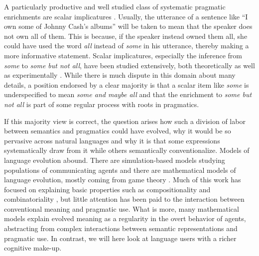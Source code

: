 \documentclass[a4paper, 11pt]{article}
\theoremstyle{Satz}
\begin{document}
A particularly productive and well studied class of systematic pragmatic enrichments are scalar
implicatures
\citep{horn:1984,Hirschberg1985:A-Theory-of-Sca,LevinsonPragmatics1983,Geurts2010:Quantity-Implic}. Usually,
the utterance of a sentence like ``I own some of Johnny Cash's albums'' will be taken to mean
that the speaker does not own all of them. This is because, if the speaker instead owned them all, she
could have used the word \emph{all} instead of \emph{some} in his utterance, thereby making a
more informative statement. Scalar implicatures, especially the inference from \emph{some} to
\emph{some but not all}, have been studied extensively, both theoretically
\citep[e.g.,][]{Sauerland2004:Scalar-Implicat,ChierchiaFox2008:The-Grammatical,Rooyvan-RooijJagerde-Jager2012:Explaining-Quan}
as well as experimentally
\citep[e.g.,][]{BottNoveck2004:Some-Utterances,huang+snedeker:2009,GrodnerKlein2010:Some-and-Possib,GoodmanStuhlmuller2013:Knowledge-and-I,DegenTanenhaus2012:Processing-Scal}. While
there is much dispute in this domain about many details, a position endorsed by a clear
majority is that a scalar item like \emph{some} is underspecified to mean \emph{some and maybe
  all} and that the enrichment to \emph{some but not all} is part of some regular process with
roots in pragmatics.

If this majority view is correct, the question arises how such a division of labor between
semantics and pragmatics could have evolved, why it would be so pervasive across natural
languages and why it is that some expressions systematically draw from it while others semantically conventionalize. Models of language evolution abound. There are simulation-based models studying
populations of communicating agents
\citep{Hurford1989:Biological-Evol,Steels1995:A-Self-Organizi,LenaertsJansen2005:The-Evolutionar,SteelsBelpaeme2005:Coordinating-Pe,BaronchelliPuglisi2008:Cultural-route-,steels:2011,SpikeStadler2016:Minimal-Require}
and there are mathematical models of language evolution, mostly coming from game theory
\citep{lewis:1969,Warneryd1993:Cheap-Talk-Coor,BlumeKim1993:Evolutionary-St,nowak+krakauer:1999,Huttegger2007:Evolution-and-t,Skyrms2010:Signals}. Much
of this work has focused on explaining basic properties such as compositionality and
combinatoriality
\citep[e.g.,][]{Batali1998:Computational-S,nowak+krakauer:1999,nowak+etal:2000,KirbyHurford2002:The-Emergence-o,kirby:2002,SmithKirby2003:Iterated-Learni,Gong2007:Language-Evolut,kirby+etal:2015,verhoef+etal:2014,Franke2015:Proto-Syntax},
but little attention has been paid to the interaction between conventional meaning and
pragmatic use. What is more, many mathematical models explain evolved meaning as a regularity
in the overt behavior of agents, abstracting from complex interactions between semantic
representations and pragmatic use. In contrast, we will here look at language users with a
richer cognitive make-up.
\end{document}
